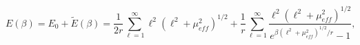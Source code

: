 \begin{equation}
E\left(\beta \right)=E_{0}+\widetilde{E}\left(\beta \right)=\frac{1}{2r}\sum _{\ell =1}^{\infty }\ell ^{2}\left(\ell ^{2}+\mu _{eff}^{2}\right)^{1/2}+\frac{1}{r}\sum _{\ell =1}^{\infty }\frac{\ell ^{2}\left(\ell ^{2}+\mu _{eff}^{2}\right)^{1/2}}{e^{\beta \left(\ell ^{2}+\mu _{eff}^{2}\right)^{1/2}/r}-1},\end{equation}

